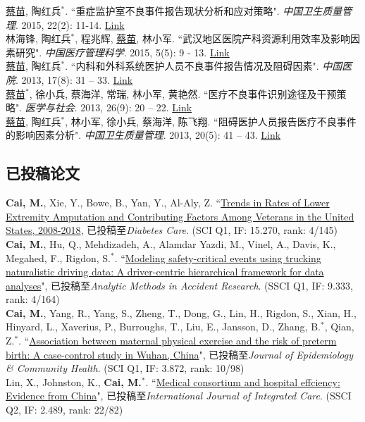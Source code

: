 \documentclass[11pt, a4paper]{article}
\newcommand{\years}[1]{\marginnote{\scriptsize #1}}
\begin{document}
\years{2015}\underline{蔡苗}, 陶红兵$^\ast$. ``重症监护室不良事件报告现状分析和应对策略". \emph{中国卫生质量管理}. 2015, 22(2): 11-14. \href{http://www.cnki.com.cn/Article/CJFDTOTAL-WSJG201502008.htm}{Link}\\[6pt]
\years{2015} 林海锋, 陶红兵$^\ast$, 程兆辉, \underline{蔡苗}, 林小军. ``武汉地区医院产科资源利用效率及影响因素研究". \emph{中国医疗管理科学}. 2015, 5(5): 9 - 13. \href{http://www.cnki.com.cn/Article/CJFDTOTAL-YLGL201505004.htm}{Link}\\[6pt]
\years{2013}\underline{蔡苗}, 陶红兵$^\ast$. ``内科和外科系统医护人员不良事件报告情况及阻碍因素". \emph{中国医院}. 2013, 17(8): 31 – 33. \href{http://www.cnki.com.cn/Article/CJFDTOTAL-ZGYU201308016.htm}{Link}\\[6pt]
\years{2013}\underline{蔡苗}$^\ast$,  徐小兵, 蔡海洋, 常瑞, 林小军, 黄艳然. ``医疗不良事件识别途径及干预策略". \emph{医学与社会}. 2013, 26(9): 20 – 22. \href{http://www.cnki.com.cn/Article/CJFDTOTAL-YXSH201309007.htm}{Link}\\[6pt]
\years{2013}\underline{蔡苗}, 陶红兵$^\ast$, 林小军, 徐小兵, 蔡海洋, 陈飞翔. ``阻碍医护人员报告医疗不良事件的影响因素分析". \emph{中国卫生质量管理}. 2013, 20(5): 41 – 43. \href{http://www.cqvip.com/qk/98273x/201305/47221843.html}{Link}

\subsection*{已投稿论文}
\noindent
\years{2019}\textbf{Cai, M.}, Xie, Y., Bowe, B., Yan, Y., Al-Aly, Z. ``\ul{Trends in Rates of Lower Extremity Amputation and Contributing Factors Among Veterans in the United States, 2008-2018}, 已投稿至\emph{Diabetes Care}. (SCI Q1, IF: 15.270, rank: 4/145)\\[6pt]
\years{2020}\textbf{Cai, M.}, Hu, Q., Mehdizadeh, A., Alamdar Yazdi, M., Vinel, A., Davis, K., Megahed, F., Rigdon, S.$^\ast$. ``\ul{Modeling safety-critical events using trucking naturalistic driving data: A driver-centric hierarchical framework for data analyses}", 已投稿至\emph{Analytic Methods in Accident Research}. (SSCI Q1, IF: 9.333, rank: 4/164)\\[6pt]
\years{2020}\textbf{Cai, M.}, Yang, R., Yang, S., Zheng, T., Dong, G., Lin, H., Rigdon, S., Xian, H., Hinyard, L., Xaverius, P., Burroughs, T., Liu, E., Jansson, D., Zhang, B.$^\ast$, Qian, Z.$^\ast$. ``\ul{Association between maternal physical exercise and the risk of preterm birth: A case-control study in Wuhan, China}", 已投稿至\emph{Journal of Epidemiology \& Community Health}. (SCI Q1, IF: 3.872, rank: 10/98)\\[6pt]
\years{2020}Lin, X., Johnston, K., \textbf{Cai, M.$^*$}. ``\ul{Medical consortium and hospital effciency: Evidence from China}", 已投稿至\emph{International Journal of Integrated Care}. (SSCI Q2, IF: 2.489, rank: 22/82)
\end{document}
